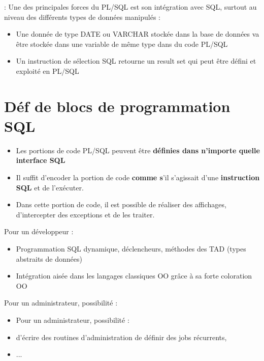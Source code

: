 \documentclass[10pt]{beamer}
\begin{document}
\begin{frame}{\secname : \subsecname}
    Une des principales forces du PL/SQL est son intégration avec SQL, surtout au niveau des différents types de données manipulés :
    \begin{itemize}
        \item Une donnée de type DATE ou VARCHAR stockée dans la base de données va être stockée dans une variable de même type dans du code PL/SQL
        \item Un instruction de sélection SQL retourne un result set qui peut être défini et exploité en PL/SQL
    \end{itemize}
\end{frame}
\section{Déf de blocs de programmation SQL}
\begin{frame}{\secname}
    \begin{itemize}
        \item Les portions de code PL/SQL peuvent être \textbf{définies dans n'importe quelle interface SQL}
        \item Il suffit d'encoder la portion de code \textbf{comme s}'il s'agissait d'une \textbf{instruction SQL} et de l'exécuter.
        \item Dans cette portion de code, il est possible de réaliser des affichages, d'intercepter des exceptions et de les traiter.
    \end{itemize}
\end{frame}

\begin{frame}{\secname}
    Pour un développeur :
    \begin{itemize}
        \item Programmation SQL dynamique, déclencheurs, méthodes des TAD (types abstraits de données)
        \item Intégration aisée dans les langages classiques OO grâce à sa forte coloration OO
    \end{itemize}
\end{frame}

\begin{frame}{\secname}
    Pour un administrateur, possibilité :
    \begin{itemize}
        \item Pour un administrateur, possibilité :
        \item d'écrire des routines d'administration de définir des jobs récurrents,
        \item ...
    \end{itemize}
\end{frame}
\end{document}
